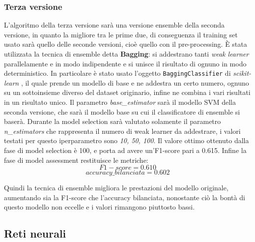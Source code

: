 \subsubsection{Terza versione}\label{subsubsec:svmv3}
L'algoritmo della terza versione sarà una versione ensemble della seconda versione, in quanto la migliore tra le prime due, di conseguenza il training set usato sarà quello delle seconde versioni, cioè quello con il pre-processing. È stata utilizzata la tecnica di ensemble detta \textbf{Bagging}: si addestrano tanti \textit{weak learner} parallelamente e in modo indipendente e si unisce il risultato di ognuno in modo deterministico. In particolare è stato usato l'oggetto \verb+BaggingClassifier+ di \textit{scikit-learn} \cite{sklearn}, il quale prende un modello di base e ne addestra un certo numero, ognuno su un sottoinsieme diverso del dataset originario, infine ne combina i vari risultati in un risultato unico. Il parametro \textit{base\_estimator} sarà il modello SVM della seconda versione, che sarà il modello base su cui il classificatore di ensemble si baserà. Durante la model selection sarà valutato solamente il parametro \textit{n\_estimators} che rappresenta il numero di weak learner da addestrare, i valori testati per questo iperparametro sono \textit{10, 50, 100}. Il valore ottimo ottenuto dalla fase di model selection è 100, e porta ad avere un'F1-score pari a 0.615. Infine la fase di model assessment restituisce le metriche:
$$F1-score = 0.610$$
$$accuracy\_bilanciata = 0.602$$

Quindi la tecnica di ensemble migliora le prestazioni del modello originale, aumentando sia la F1-score che l'accuracy bilanciata, nonostante ciò la bontà di questo modello non eccelle e i valori rimangono piuttosto bassi.

\subsection{Reti neurali}
